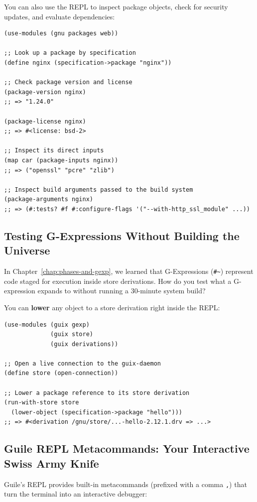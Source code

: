 You can also use the REPL to inspect package objects, check for security updates, and evaluate dependencies:

\begin{lstlisting}[style=guixscheme]
(use-modules (gnu packages web))

;; Look up a package by specification
(define nginx (specification->package "nginx"))

;; Check package version and license
(package-version nginx)
;; => "1.24.0"

(package-license nginx)
;; => #<license: bsd-2>

;; Inspect its direct inputs
(map car (package-inputs nginx))
;; => ("openssl" "pcre" "zlib")

;; Inspect build arguments passed to the build system
(package-arguments nginx)
;; => (#:tests? #f #:configure-flags '("--with-http_ssl_module" ...))
\end{lstlisting}

\subsection{Testing G-Expressions Without Building the Universe}

In Chapter~\ref{chap:phases-and-gexp}, we learned that G-Expressions (\texttt{\#\~{}}) represent code staged for execution inside store derivations. How do you test what a G-expression expands to without running a 30-minute system build?

You can \textbf{lower} any object to a store derivation right inside the REPL:

\begin{lstlisting}[style=guixscheme]
(use-modules (guix gexp)
             (guix store)
             (guix derivations))

;; Open a live connection to the guix-daemon
(define store (open-connection))

;; Lower a package reference to its store derivation
(run-with-store store
  (lower-object (specification->package "hello")))
;; => #<derivation /gnu/store/...-hello-2.12.1.drv => ...>
\end{lstlisting}

\subsection{Guile REPL Metacommands: Your Interactive Swiss Army Knife}

Guile's REPL provides built-in metacommands (prefixed with a comma \texttt{,}) that turn the terminal into an interactive debugger:

